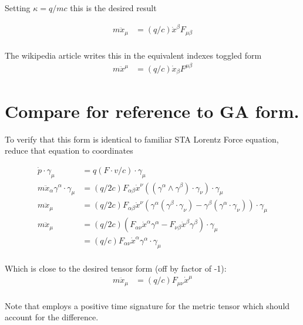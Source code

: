 \documentclass{article}
\newcommand{\xdot}[0]{\dot{x}}
\newcommand{\xddot}[0]{\ddot{x}}
\newcommand{\pdot}[0]{\dot{p}}
\begin{document}
Setting $\kappa = q/mc$ this is the desired result

\begin{align*}
m \xddot_\mu &= (q/c) \xdot^\beta F_{\mu\beta} \\
\end{align*}

The wikipedia article \cite{wikiLorentzForce} writes this in the equivalent indexes toggled form
\begin{align*}
m \xddot^\mu &= (q/c) \xdot_\beta F^{\mu\beta}
\end{align*}

\section{ Compare for reference to GA form. }

To verify that this form is identical to familiar STA Lorentz Force equation,
reduce that equation to coordinates

\begin{align*}
\pdot \cdot \gamma_\mu &= q (F \cdot v/c) \cdot \gamma_\mu \\
m \xddot_\alpha \gamma^\alpha \cdot \gamma_\mu &= (q/2c) F_{\alpha\beta} \xdot^\nu
((\gamma^{\alpha} \wedge \gamma^{\beta}) \cdot \gamma_\nu) \cdot \gamma_\mu \\
m \xddot_\mu &=
(q/2c) F_{\alpha\beta} \xdot^\nu \left( \gamma^{\alpha} (\gamma^{\beta} \cdot \gamma_\nu) -\gamma^{\beta} (\gamma^{\alpha} \cdot \gamma_\nu) \right) \cdot \gamma_\mu \\
m \xddot_\mu &= 
(q/2c) \left( F_{\alpha\nu} \xdot^\alpha \gamma^{\alpha} - F_{\nu\beta} \xdot^\beta \gamma^{\beta} \right) \cdot \gamma_\mu \\
&= (q/c) F_{\alpha\nu} \xdot^\alpha \gamma^{\alpha} \cdot \gamma_\mu \\
\end{align*}

Which is close to the desired tensor form (off by factor of -1):
\begin{align*}
m \xddot_\mu &= (q/c) F_{\mu\nu} \xdot^\mu \\
\end{align*}

Note that \cite{doran2003gap} employs a positive time signature for the metric tensor which
should account for the difference.

\end{document}
